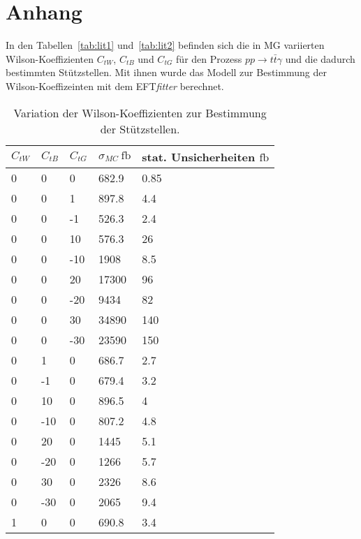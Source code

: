 \chapter{Anhang}
In den Tabellen~\ref{tab:lit1} und~\ref{tab:lit2} befinden sich die in MG variierten Wilson-Koeffizienten $C_{tW}$, $C_{tB}$ und $C_{tG}$ für den Prozess $pp\rightarrow t\bar{t}\gamma$ und die dadurch bestimmten Stützstellen. Mit ihnen wurde das Modell zur Bestimmung der Wilson-Koeffizeinten mit dem EFT\textit{fitter} berechnet.
\begin{table}
  \centering
  \caption{Variation der Wilson-Koeffizienten zur Bestimmung der Stützstellen.}
  \begin{tabular}{lllll}
    \toprule
    $C_{tW}$ & $C_{tB}$ & $C_{tG}$ & $\sigma_{MC}~\si{\femto\barn}$ & stat. Unsicherheiten $\si{\femto\barn}$\\
		\midrule
  0    &     0      &     0      &      682.9   &    0.85\\
  0    &     0      &     1      &      897.8   &    4.4\\
  0    &     0      &     -1     &      526.3   &    2.4\\
  0    &     0      &     10     &      576.3   &    26\\
  0    &     0      &     -10    &      1908    &    8.5\\
  0    &     0      &     20     &      17300   &    96\\
  0    &     0      &     -20    &      9434    &    82\\
  0    &     0      &     30     &      34890   &    140\\
  0    &     0      &     -30    &      23590   &    150\\
  0    &     1      &     0      &      686.7   &    2.7\\
  0    &     -1     &     0      &      679.4   &    3.2\\
  0    &     10     &     0      &      896.5   &    4\\
  0    &     -10    &     0      &      807.2   &    4.8\\
  0    &     20     &     0      &      1445    &    5.1\\
  0    &     -20    &     0      &      1266    &    5.7\\
  0    &     30     &     0      &      2326    &    8.6\\
  0    &     -30    &     0      &      2065    &    9.4\\
  1    &     0      &     0      &      690.8   &    3.4\\

\end{tabular}
\end{table}

